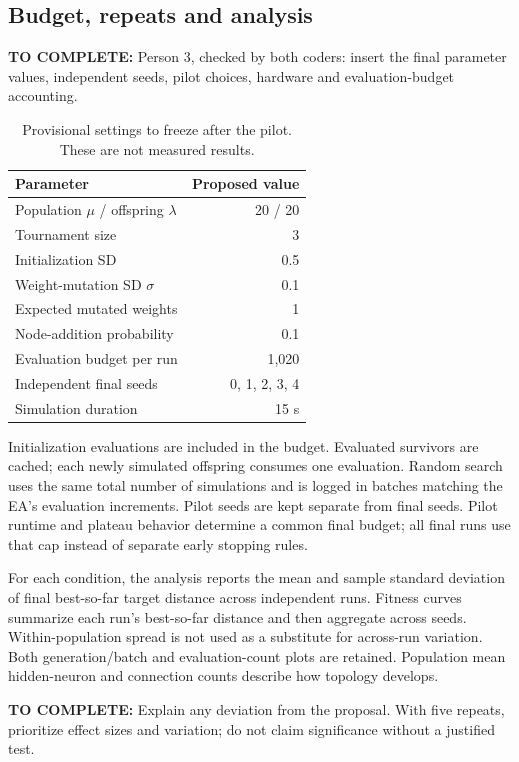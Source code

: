 \documentclass[sigconf,nonacm]{acmart}
\newcommand{\todo}[1]{\par\smallskip\noindent\textcolor{blue!60!black}{\textbf{TO COMPLETE:} #1}\par\smallskip}
\begin{document}
\subsection{Budget, repeats and analysis}
\todo{Person 3, checked by both coders: insert the final parameter values,
independent seeds, pilot choices, hardware and evaluation-budget accounting.}

\begin{table}[t]
\caption{Provisional settings to freeze after the pilot. These are not measured results.}
\label{tab:settings}
\centering
\begin{tabular}{lr}
\toprule
Parameter & Proposed value\\
\midrule
Population $\mu$ / offspring $\lambda$ & 20 / 20\\
Tournament size & 3\\
Initialization SD & 0.5\\
Weight-mutation SD $\sigma$ & 0.1\\
Expected mutated weights & 1\\
Node-addition probability & 0.1\\
Evaluation budget per run & 1,020\\
Independent final seeds & 0, 1, 2, 3, 4\\
Simulation duration & 15 s\\
\bottomrule
\end{tabular}
\end{table}

Initialization evaluations are included in the budget. Evaluated survivors are
cached; each newly simulated offspring consumes one evaluation. Random search
uses the same total number of simulations and is logged in batches matching the
EA's evaluation increments. Pilot seeds are kept separate from final seeds.
Pilot runtime and plateau behavior determine a common final budget; all final
runs use that cap instead of separate early stopping rules.

For each condition, the analysis reports the mean and sample standard deviation
of final best-so-far target distance across independent runs. Fitness curves
summarize each run's best-so-far distance and then aggregate across seeds.
Within-population spread is not used as a substitute for across-run variation.
Both generation/batch and evaluation-count plots are retained. Population mean
hidden-neuron and connection counts describe how topology develops.
\todo{Explain any deviation from the proposal. With five repeats, prioritize
effect sizes and variation; do not claim significance without a justified test.}
\end{document}
